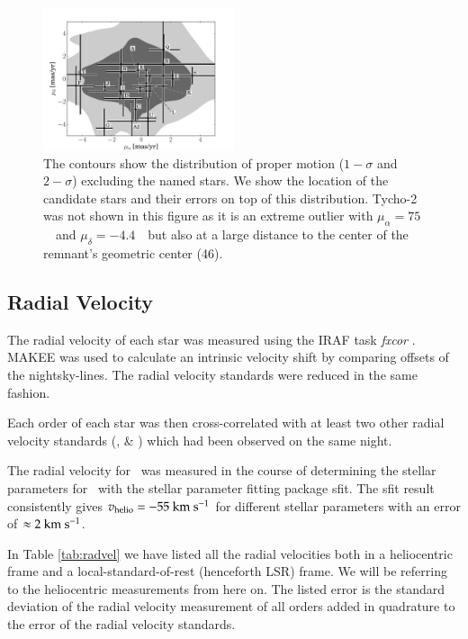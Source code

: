 \begin{figure}[htbp] %
   \centering
   \includegraphics[width=0.5\textwidth]{chapter_sn1572_hires/plots/propmot_distr.pdf}
   \caption[Proper motion measurement of stars in SN 1572 using only HST images]{The contours show the distribution of proper motion ($1-\sigma$ and $2-\sigma$) excluding the named stars.
    We show the location of the candidate stars and their errors on top of this distribution. Tycho-2 was not shown in this figure as it is an extreme outlier with $\mu_\alpha=75$~\masyr\ and $\mu_\delta=-4.4$~\masyr\ but also at a large distance to the center of the remnant's geometric center (46\arcsec).}
   \label{fig:propmot_sn1572_hires}
\end{figure}


\subsection{Radial Velocity}
\label{sec:radvel}

The radial velocity of each star was measured using the IRAF task \textit{fxcor} \citep{1979AJ.....84.1511T}. MAKEE was used to calculate an intrinsic velocity shift by comparing offsets of the nightsky-lines. The radial velocity standards were reduced in the same fashion. 
 
Each order of each star was then cross-correlated with at least two other radial velocity standards (,  \& ) which had been observed on the same night.


The radial velocity for \starb\ was measured in the course of determining the stellar parameters for \starb\ with the stellar parameter fitting package \gls{sfit}. The \gls{sfit} result consistently gives $v_\textrm{helio} = -55~\textrm{km}~\textrm{s}^{-1}$ for different stellar parameters with an error of $\approx 2~\textrm{km}~\textrm{s}^{-1}$. 


In Table \ref{tab:radvel} we have listed all the radial velocities both in a heliocentric frame and a local-standard-of-rest (henceforth LSR) frame. We will be referring to the heliocentric measurements from here on. The listed error is the standard deviation of the radial velocity measurement of all orders added in quadrature to the error of the radial velocity standards.

